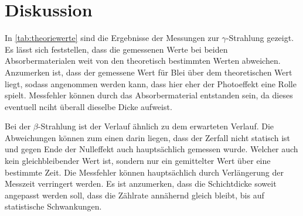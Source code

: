 \section{Diskussion}
\label{sec:Diskussion}

In \autoref{tab:theoriewerte} sind die Ergebnisse der Messungen zur $\gamma$-Strahlung gezeigt.
Es lässt sich feststellen, dass die gemessenen Werte bei beiden Absorbermaterialen weit von den 
theoretisch bestimmten Werten abweichen. Anzumerken ist, dass der gemessene Wert für Blei über dem 
theoretischen Wert liegt, sodass angenommen werden kann, dass hier eher der Photoeffekt eine Rolle spielt.
Messfehler können durch das Absorbermaterial entstanden sein, da dieses eventuell nciht überall dieselbe Dicke 
aufweist.




Bei der $\beta$-Strahlung ist der Verlauf ähnlich zu dem erwarteten Verlauf. Die Abweichungen können zum einen darin liegen, dass der Zerfall 
nicht statisch ist und gegen Ende der Nulleffekt auch hauptsächlich gemessen wurde. Welcher auch kein gleichbleibender Wert ist, sondern nur ein 
gemittelter Wert über eine bestimmte Zeit.
Die Messfehler können hauptsächlich durch Verlängerung der Messzeit verringert werden.
Es ist anzumerken, dass die Schichtdicke soweit angepasst werden soll, dass die Zählrate annähernd gleich bleibt, 
bis auf statistische Schwankungen.
